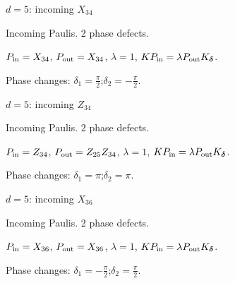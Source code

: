 \vfill
{\footnotesize\texttt{}}
\newpage
{}
{\Large $d=5$: incoming $X_{34}$}\par
Incoming Paulis. 2 phase defects.
\begin{center}
\end{center}
\vspace{-1mm}
$P_{\rm in}=X_{34}$, \quad $P_{\rm out}=X_{34}$, \quad $\lambda=1$, \qquad $K P_{\rm in}=\lambda P_{\rm out}K_{\boldsymbol\delta}$.
\par\smallskip\begin{minipage}{.98\linewidth}\small Phase changes: $\delta_{1}=\frac{\pi}{2}$;\quad $\delta_{2}=-\frac{\pi}{2}$.\end{minipage}
\vfill
{\footnotesize\texttt{}}
\newpage
{}
{\Large $d=5$: incoming $Z_{34}$}\par
Incoming Paulis. 2 phase defects.
\begin{center}
\end{center}
\vspace{-1mm}
$P_{\rm in}=Z_{34}$, \quad $P_{\rm out}=Z_{25}Z_{34}$, \quad $\lambda=1$, \qquad $K P_{\rm in}=\lambda P_{\rm out}K_{\boldsymbol\delta}$.
\par\smallskip\begin{minipage}{.98\linewidth}\small Phase changes: $\delta_{1}=\pi$;\quad $\delta_{2}=\pi$.\end{minipage}
\vfill
{\footnotesize\texttt{}}
\newpage
{}
{\Large $d=5$: incoming $X_{36}$}\par
Incoming Paulis. 2 phase defects.
\begin{center}
\end{center}
\vspace{-1mm}
$P_{\rm in}=X_{36}$, \quad $P_{\rm out}=X_{36}$, \quad $\lambda=1$, \qquad $K P_{\rm in}=\lambda P_{\rm out}K_{\boldsymbol\delta}$.
\par\smallskip\begin{minipage}{.98\linewidth}\small Phase changes: $\delta_{1}=-\frac{\pi}{2}$;\quad $\delta_{2}=\frac{\pi}{2}$.\end{minipage}
\vfill
{\footnotesize\texttt{}}
\newpage
{}
